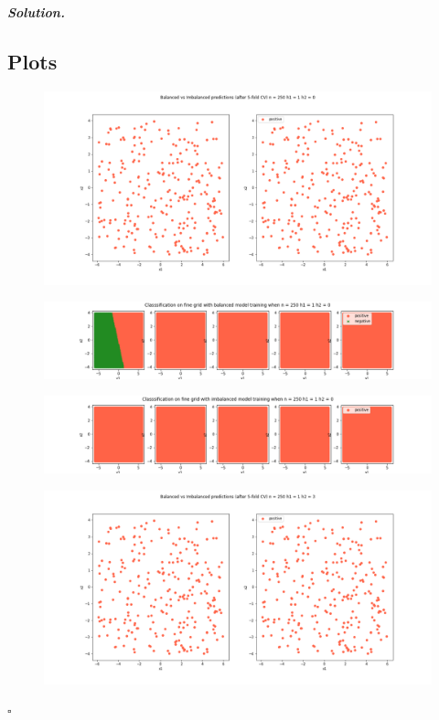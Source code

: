\documentclass[10pt]{article}
\newenvironment{solution}[1][\it{Solution}]{\textbf{#1. } }{$\square$}
\begin{document}
\begin{solution}
\subsection*{Plots}

\begin{figure}[H]
\includegraphics[width=16cm, keepaspectratio]{./3/1}
\end{figure}
\begin{figure}[H]
\includegraphics[width=16cm, keepaspectratio]{./3/2}
\end{figure}
\begin{figure}[H]
\includegraphics[width=16cm, keepaspectratio]{./3/3}
\end{figure}
\begin{figure}[H]
\includegraphics[width=16cm, keepaspectratio]{./3/4}

\end{figure}
\end{solution}
\end{document}
